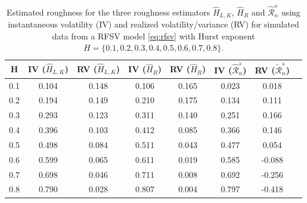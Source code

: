 \documentclass{article}
\begin{document}
\begin{table}[htbp]
    \centering
    \begin{tabular}{cccccccc}
        \toprule
        H & IV ($\widehat{H}_{L,K}$) & RV ($\widehat{H}_{L,K}$) & IV ($\widehat{H}_R$) & RV ($\widehat{H}_R$) & IV ($\widehat{\mathscr{R}}_n^s$) & RV ($\widetilde{\mathscr{R}}_n^s$)\\
        \midrule
        0.1 & 0.104 & 0.148 & 0.106 & 0.165 & 0.023 & 0.018\\
        0.2 & 0.194 & 0.149 & 0.210 & 0.175 & 0.134 & 0.111\\
        0.3 & 0.293 & 0.123 & 0.311 & 0.140 & 0.251 & 0.166\\
        0.4 & 0.396 & 0.103 & 0.412 & 0.085 & 0.366 & 0.146\\
        0.5 & 0.498 & 0.084 & 0.511 & 0.043 & 0.477 & 0.054\\
        0.6 & 0.599 & 0.065 & 0.611 & 0.019 & 0.585 & -0.088\\
        0.7 & 0.698 & 0.046 & 0.711 & 0.008 & 0.692 & -0.256\\
        0.8 & 0.790 & 0.028 & 0.807 & 0.004 & 0.797 & -0.418\\
        \bottomrule
    \end{tabular}
    \caption{Estimated roughness for the three roughness estimators $\widehat{H}_{L,K}$, $\widehat{H}_R$ and $\widehat{\mathscr{R}}_n^s$ using instantaneous volatility (IV) and realized volatility/variance (RV) for simulated data from a RFSV model \eqref{eq:rfsv} with Hurst exponent $H=\{0.1,0.2,0.3,0.4,0.5,0.6,0.7,0.8\}$.}
    \label{tab:ex8table}
\end{table}
\end{document}
